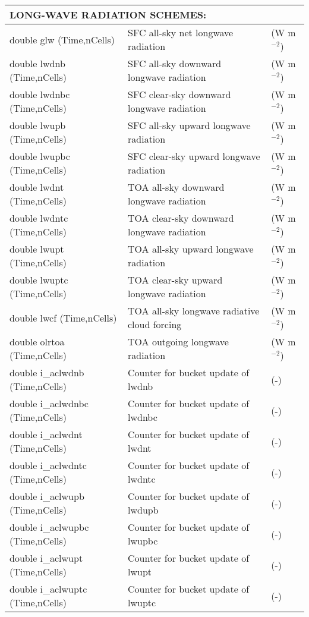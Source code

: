 {\begin{longtable}{|p{2.0in} |p{3.0in} |p{1.0in} |}
\multicolumn{3}{|l|}{{\rule[-3mm]{0mm}{8mm}\bf LONG-WAVE RADIATION SCHEMES:} \hfill}\\ \hline
double glw (Time,nCells)  & SFC all-sky net longwave radiation & (W m$^{-2}$) \\ \hline
double lwdnb (Time,nCells)  & SFC all-sky downward longwave radiation & (W m$^{-2}$) \\ \hline
double lwdnbc (Time,nCells)  & SFC clear-sky downward longwave radiation & (W m$^{-2}$) \\ \hline
double lwupb (Time,nCells)  & SFC all-sky upward longwave radiation & (W m$^{-2}$) \\ \hline
double lwupbc (Time,nCells)  & SFC clear-sky upward longwave radiation & (W m$^{-2}$) \\ \hline
double lwdnt (Time,nCells)  & TOA all-sky downward longwave radiation & (W m$^{-2}$) \\ \hline
double lwdntc (Time,nCells) & TOA clear-sky downward longwave radiation & (W m$^{-2}$) \\ \hline
double lwupt (Time,nCells)  & TOA all-sky upward longwave radiation & (W m$^{-2}$) \\ \hline
double lwuptc (Time,nCells)  & TOA clear-sky upward longwave radiation & (W m$^{-2}$) \\ \hline
double lwcf (Time,nCells)  & TOA all-sky longwave radiative cloud forcing & (W m$^{-2}$) \\ \hline
double olrtoa (Time,nCells) & TOA outgoing longwave radiation & (W m$^{-2}$) \\ \hline 
double i\_aclwdnb (Time,nCells) & Counter for bucket update of lwdnb & (-) \\ \hline
double i\_aclwdnbc (Time,nCells) & Counter for bucket update of lwdnbc & (-) \\ \hline
double i\_aclwdnt (Time,nCells) & Counter for bucket update of lwdnt & (-) \\ \hline
double i\_aclwdntc (Time,nCells) & Counter for bucket update of lwdntc & (-) \\ \hline
double i\_aclwupb (Time,nCells) & Counter for bucket update of lwdupb & (-) \\ \hline
double i\_aclwupbc (Time,nCells) & Counter for bucket update of lwupbc & (-) \\ \hline
double i\_aclwupt (Time,nCells) & Counter for bucket update of lwupt & (-) \\ \hline
double i\_aclwuptc (Time,nCells) & Counter for bucket update of lwuptc & (-) \\ \hline

\end{longtable}}
